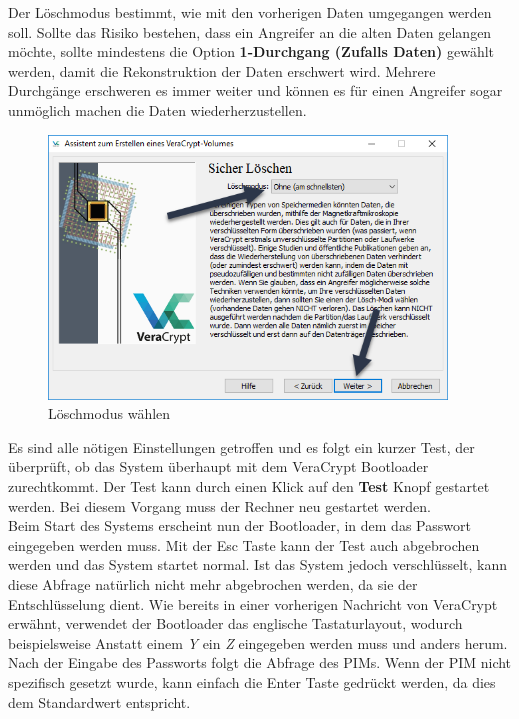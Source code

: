 \documentclass[12pt,a4paper]{scrreprt}
\begin{document}
\noindent Der Löschmodus bestimmt, wie mit den vorherigen Daten umgegangen werden soll. Sollte das Risiko bestehen, dass ein Angreifer an die alten Daten gelangen möchte, sollte mindestens die Option \textbf{1-Durchgang (Zufalls Daten)} gewählt werden, damit die Rekonstruktion der Daten erschwert wird. Mehrere Durchgänge erschweren es immer weiter und können es für einen Angreifer sogar unmöglich machen die Daten wiederherzustellen.

\begin{figure}[h]
\begin{center}
\includegraphics[width=300pt]{media/deletemode.png}
\caption{Löschmodus wählen}
\label{deletemode}
\end{center}
\end{figure}

\newpage

\noindent Es sind alle nötigen Einstellungen getroffen und es folgt ein kurzer Test, der überprüft, ob das System überhaupt mit dem VeraCrypt Bootloader zurechtkommt. Der Test kann durch einen Klick auf den \textbf{Test} Knopf gestartet werden. Bei diesem Vorgang muss der Rechner neu gestartet werden.\\

\noindent Beim Start des Systems erscheint nun der Bootloader, in dem das Passwort eingegeben werden muss. Mit der Esc Taste kann der Test auch abgebrochen werden und das System startet normal. Ist das System jedoch verschlüsselt, kann diese Abfrage natürlich nicht mehr abgebrochen werden, da sie der Entschlüsselung dient. Wie bereits in einer vorherigen Nachricht von VeraCrypt erwähnt, verwendet der Bootloader das englische Tastaturlayout, wodurch beispielsweise Anstatt einem \textit{Y} ein \textit{Z} eingegeben werden muss und anders herum.\\

\noindent Nach der Eingabe des Passworts folgt die Abfrage des PIMs. Wenn der PIM nicht spezifisch gesetzt wurde, kann einfach die Enter Taste gedrückt werden, da dies dem Standardwert entspricht.
\end{document}

